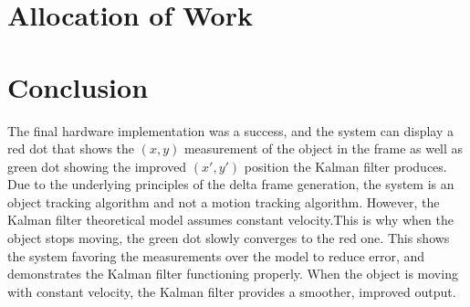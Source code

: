 \documentclass[11pt]{article} %
\begin{document}
\section{Allocation of Work}
\section{Conclusion}
The final hardware implementation was a success, and the system can display a red dot that shows the $(x,y)$ measurement of the object in the frame as well as green dot showing the improved $(x',y')$ position the Kalman filter produces. Due to the underlying principles of the delta frame generation, the system is an object tracking algorithm and not a motion tracking algorithm. However, the Kalman filter theoretical model assumes constant velocity.This is why when the object stops moving, the green dot slowly converges to the red one. This shows the system favoring the measurements over the model to reduce error, and demonstrates the Kalman filter functioning properly. When the object is moving with constant velocity, the Kalman filter provides a smoother, improved output.
\newpage
\end{document}
